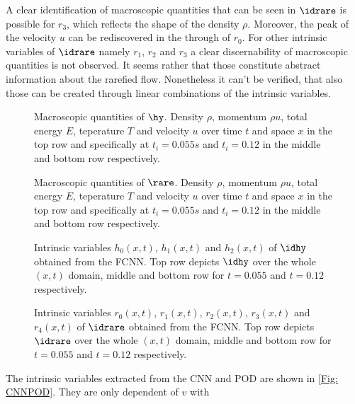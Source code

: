A clear identification of macroscopic quantities that can be seen in \(\idrare\) is possible for \(r_3\), which reflects the shape of the density \(\rho\). Moreover, the peak of the velocity \(u\) can be rediscovered in the through of \(r_0\). For other intrinsic variables of \(\idrare\) namely \(r_1\), \(r_2\) and \(r_3\) a clear discernability of macroscopic quantities is not observed. It seems rather that those constitute abstract information about the rarefied flow. Nonetheless it can't be verified, that also those can be created through linear combinations of the intrinsic variables.
\clearpage
\begin{figure}[htp!]
	
	\caption{Macroscopic quantities of \(\hy\). Density \(\rho\), momentum \(\rho u\), total energy \(E\), teperature \(T\) and velocity \(u\) over time \(t\) and space \(x\) in the top row and specifically at \(t_i=0.055s\) and \(t_i=0.12\) in the middle and bottom row respectively.}
	\label{Fig: Macro_hy}
\end{figure}
\begin{figure}[hbp!]
	
		\caption{Macroscopic quantities of \(\rare\). Density \(\rho\), momentum \(\rho u\), total energy \(E\), teperature \(T\) and velocity \(u\) over time \(t\) and space \(x\) in the top row and specifically at \(t_i=0.055s\) and \(t_i=0.12\) in the middle and bottom row respectively.}
	\label{Fig: Macro_rare}
\end{figure}
\clearpage
\begin{figure}[htp!]
	\centering
	
	\caption{Intrinsic variables \(h_0(x,t)\), \(h_1(x,t)\) and \(h_2(x,t)\) of \(\idhy\) obtained from the FCNN. Top row depicts \(\idhy\) over the whole \((x,t)\) domain, middle and bottom row for \(t=0.055\) and \(t=0.12\) respectively.}
	\label{Fig: Code_hy}
\end{figure}
\begin{figure}[hbp!]
	
	\caption{Intrinsic variables \(r_0(x,t)\), \(r_1(x,t)\), \(r_2(x,t)\), \(r_3(x,t)\) and \(r_4(x,t)\) of \(\idrare\) obtained from the FCNN. Top row depicts \(\idrare\) over the whole \((x,t)\) domain, middle and bottom row for \(t=0.055\) and \(t=0.12\) respectively.}
	\label{Fig: Code_rare}
\end{figure}
\clearpage
The intrinsic variables extracted from the CNN and POD are shown in \cref{Fig: CNNPOD}. They are only dependent of \(v\) with\\
